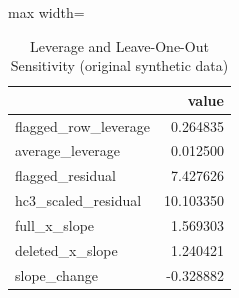 \begin{table}[htbp]
\centering
\caption{Leverage and Leave-One-Out Sensitivity (original synthetic data)}
\begingroup
\small
\setlength{\tabcolsep}{6pt}
\renewcommand{\arraystretch}{1.12}
\begin{adjustbox}{max width=\linewidth}
\begin{tabular}{@{}lr@{}}
\toprule
 & value \\
\midrule
flagged\_row\_leverage & 0.264835 \\
average\_leverage & 0.012500 \\
flagged\_residual & 7.427626 \\
hc3\_scaled\_residual & 10.103350 \\
full\_x\_slope & 1.569303 \\
deleted\_x\_slope & 1.240421 \\
slope\_change & -0.328882 \\
\bottomrule
\end{tabular}
\end{adjustbox}
\endgroup
\end{table}